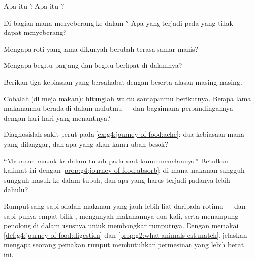 \begin{exercise}[$\star$]\label{exo:g4:journey-of-food:3}
Apa itu ? Apa itu ?
\end{exercise}

\begin{exercise}[$\star$]\label{exo:g4:journey-of-food:4}
Di bagian mana  menyeberang ke dalam ? Apa yang terjadi
pada yang tidak dapat menyeberang?
\end{exercise}

\begin{exercise}[$\star$]\label{exo:g4:journey-of-food:5}
Mengapa roti yang lama dikunyah berubah terasa samar manis?
\end{exercise}

\begin{exercise}[$\star$]\label{exo:g4:journey-of-food:6}
Mengapa  begitu panjang dan begitu berlipat di dalamnya?
\end{exercise}

\begin{exercise}[$\star$]\label{exo:g4:journey-of-food:7}
Berikan tiga kebiasaan yang bersahabat dengan  beserta
alasan masing-masing.
\end{exercise}

\begin{exercise}[$\star$]\label{exo:g4:journey-of-food:8}
Cobalah (di meja makan): hitunglah waktu santapanmu berikutnya. Berapa
lama makananmu berada di dalam mulutmu --- dan bagaimana perbandingannya
dengan hari-hari yang menantinya?
\end{exercise}

\begin{exercise}[$\star\star$]\label{exo:g4:journey-of-food:9}
Diagnosislah sakit perut pada \cref{ex:g4:journey-of-food:ache}: dua
kebiasaan mana yang dilanggar, dan apa yang akan kamu ubah besok?
\end{exercise}

\begin{exercise}[$\star\star$]\label{exo:g4:journey-of-food:10}
``Makanan masuk ke dalam tubuh pada saat kamu menelannya.'' Betulkan
kalimat ini dengan \cref{prop:g4:journey-of-food:absorb}: di mana
makanan sungguh-sungguh masuk ke dalam tubuh, dan apa yang harus
terjadi padanya lebih dahulu?
\end{exercise}

\begin{exercise}[$\star\star\star$]\label{exo:g4:journey-of-food:11}
Rumput sang sapi adalah makanan yang jauh lebih liat daripada rotimu
--- dan sapi punya empat bilik , mengunyah makanannya dua kali,
serta menampung  penolong di dalam ususnya untuk
membongkar rumputnya. Dengan memakai
\cref{def:g4:journey-of-food:digestion} dan
\cref{prop:g2:what-animals-eat:match}, jelaskan mengapa seorang
pemakan rumput membutuhkan permesinan yang lebih berat ini.
\end{exercise}
